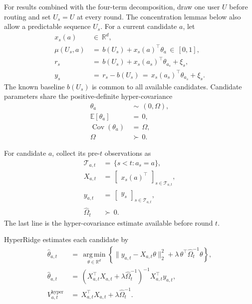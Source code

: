 \documentclass{article} %
\begin{document}
For results combined with the four-term decomposition, draw one user \(U\)
before routing and set \(U_s=U\) at every round. The concentration lemmas below
also allow a predictable sequence \(U_s\). For a current candidate \(a\), let
\begin{align}
x_s(a)
&\,\in\,
\mathbb R^d,
\label{eq:hyper-feature}
\\
\mu(U_s,a)
&\,=\,
b(U_s)+x_s(a)^\top\theta_a
\,\in\,
[0,1],
\label{eq:hyper-linear-model-app}
\\
r_s
&\,=\,
b(U_s)+x_s(a_s)^\top\theta_{a_s}+\xi_s,
\label{eq:hyper-reward}
\\
y_s
&\,=\,
r_s-b(U_s)
\,=\,
x_s(a_s)^\top\theta_{a_s}+\xi_s.
\label{eq:hyper-centered-reward}
\end{align}
The known baseline \(b(U_s)\) is common to all available candidates.
Candidate parameters share the positive-definite hyper-covariance
\begin{align}
\theta_a
&\,\sim\,
(0,\Omega),
\label{eq:hyper-random-effects}
\\
\mathbb E[\theta_a]
&\,=\,
0,
\label{eq:hyper-random-effects-mean}
\\
\operatorname{Cov}(\theta_a)
&\,=\,
\Omega,
\label{eq:hyper-random-effects-cov}
\\
\Omega
&\,\succ\,
0.
\label{eq:hyper-omega-pd}
\end{align}

For candidate \(a\), collect its pre-\(t\) observations as
\begin{align}
\mathcal T_{a,t}
&\,=\,
\{s<t:a_s=a\},
\label{eq:hyper-index-set}
\\
X_{a,t}
&\,=\,
\begin{bmatrix}
x_s(a)^\top
\end{bmatrix}_{s\in\mathcal T_{a,t}},
\label{eq:hyper-design-app}
\\
y_{a,t}
&\,=\,
\begin{bmatrix}
y_s
\end{bmatrix}_{s\in\mathcal T_{a,t}},
\label{eq:hyper-response}
\\
\widehat\Omega_t
&\,\succ\,
0.
\label{eq:hyper-omega-hat}
\end{align}
The last line is the hyper-covariance estimate available before round \(t\).

HyperRidge estimates each candidate by
\begin{align}
\widehat{\theta}_{a,t}
&\,=\,
\operatorname*{arg\,min}_{\theta\in\mathbb{R}^d}
\left\{
\|y_{a,t}-X_{a,t}\theta\|_2^2
+
\lambda\,\theta^\top\widehat{\Omega}_t^{-1}\theta
\right\},
\label{eq:hyper-estimator-argmin}
\\
\widehat{\theta}_{a,t}
&\,=\,
\left(
X_{a,t}^\top X_{a,t}
+
\lambda \widehat{\Omega}_t^{-1}
\right)^{-1}
X_{a,t}^\top y_{a,t},
\label{eq:hyper-estimator-closed}
\\
V_{a,t}^{\mathrm{hyper}}
&\,=\,
X_{a,t}^\top X_{a,t}
+
\lambda\widehat{\Omega}_t^{-1}.
\label{eq:hyper-vhat}
\end{align}
\end{document}
